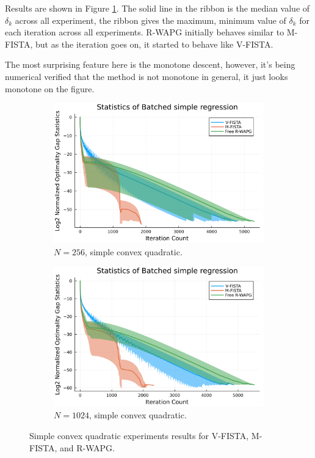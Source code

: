 \documentclass[12pt]{article}
\begin{document}
        Results are shown in Figure \ref{fig:simple-quadratic-NOG}.
        The solid line in the ribbon is the median value of $\delta_k$ across all experiment, the ribbon gives the maximum, minimum value of $\delta_k$ for each iteration across all experiments. 
        R-WAPG initially behaves similar to M-FISTA, but as the iteration goes on, it started to behave like V-FISTA.  
        \par 
        The most surprising feature here is the monotone descent, however, it's being numerical verified that the method is not monotone in general, it just looks monotone on the figure. 
        \begin{figure}[H]
            \begin{subfigure}[b]{0.47\textwidth}
                \centering
                \includegraphics[width=\textwidth]{assets/simple_regression_batched-256.png}
                \caption{$N = 256$, simple convex quadratic.}
            \end{subfigure}
            \hfill
            \begin{subfigure}[b]{0.47\textwidth}
                \centering
                \includegraphics[width=\textwidth]{assets/simple_regression_batched-1024.png}
                \caption{$N = 1024$, simple convex quadratic. }
            \end{subfigure}
            \caption{Simple convex quadratic experiments results for V-FISTA, M-FISTA, and R-WAPG. }
            \label{fig:simple-quadratic-NOG}
        \end{figure}
\end{document}
